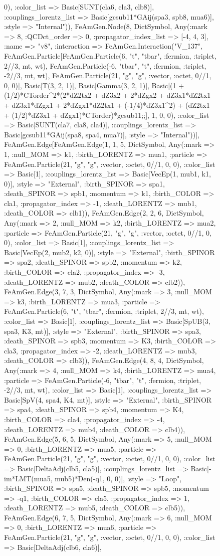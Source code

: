 \documentclass{revtex4}
\begin{document}
\begin{figure}[!htb]
\begin{center}
{0), :color_list => Basic[SUNT(cla6, cla3, clb8)], :couplings_lorentz_list => Basic[gcsub11*GAij(spa3, spb8, mua6)], :style => "Internal")), FeAmGen.Node(8, Dict{Symbol, Any}(:mark => 8, :QCDct_order => 0, :propagator_index_list => [-4, 4, 3], :name => "v8", :interaction => FeAmGen.Interaction("V_137", FeAmGen.Particle[FeAmGen.Particle(6, "t", "tbar", :fermion, :triplet, 2//3, mt, wt), FeAmGen.Particle(-6, "tbar", "t", :fermion, :triplet, -2//3, mt, wt), FeAmGen.Particle(21, "g", "g", :vector, :octet, 0//1, 0, 0)], Basic[T(3, 2, 1)], Basic[Gamma(3, 2, 1)], Basic[(1 + (1/2)*CTorder^2*(2*dZ2tx2 + dZ3x2 + 2*dZgx2 + dZ3x1*dZ2tx1 + dZ3x1*dZgx1 + 2*dZgx1*dZ2tx1 + (-1/4)*dZ3x1^2) + (dZ2tx1 + (1/2)*dZ3x1 + dZgx1)*CTorder)*gcsub11;;], 1, 0, 0), :color_list => Basic[SUNT(cla7, cla8, cla4)], :couplings_lorentz_list => Basic[gcsub11*GAij(spa8, spa4, mua7)], :style => "Internal"))], FeAmGen.Edge[FeAmGen.Edge(1, 1, 5, Dict{Symbol, Any}(:mark => 1, :null_MOM => k1, :birth_LORENTZ => mua1, :particle => FeAmGen.Particle(21, "g", "g", :vector, :octet, 0//1, 0, 0), :color_list => Basic[1], :couplings_lorentz_list => Basic[VecEp(1, mub1, k1, 0)], :style => "External", :birth_SPINOR => spa1, :death_SPINOR => spb1, :momentum => k1, :birth_COLOR => cla1, :propagator_index => -1, :death_LORENTZ => mub1, :death_COLOR => clb1)), FeAmGen.Edge(2, 2, 6, Dict{Symbol, Any}(:mark => 2, :null_MOM => k2, :birth_LORENTZ => mua2, :particle => FeAmGen.Particle(21, "g", "g", :vector, :octet, 0//1, 0, 0), :color_list => Basic[1], :couplings_lorentz_list => Basic[VecEp(2, mub2, k2, 0)], :style => "External", :birth_SPINOR => spa2, :death_SPINOR => spb2, :momentum => k2, :birth_COLOR => cla2, :propagator_index => -3, :death_LORENTZ => mub2, :death_COLOR => clb2)), FeAmGen.Edge(3, 7, 3, Dict{Symbol, Any}(:mark => 3, :null_MOM => k3, :birth_LORENTZ => mua3, :particle => FeAmGen.Particle(6, "t", "tbar", :fermion, :triplet, 2//3, mt, wt), :color_list => Basic[1], :couplings_lorentz_list => Basic[SpUB(3, spa3, K3, mt)], :style => "External", :birth_SPINOR => spa3, :death_SPINOR => spb3, :momentum => K3, :birth_COLOR => cla3, :propagator_index => -2, :death_LORENTZ => mub3, :death_COLOR => clb3)), FeAmGen.Edge(4, 8, 4, Dict{Symbol, Any}(:mark => 4, :null_MOM => k4, :birth_LORENTZ => mua4, :particle => FeAmGen.Particle(-6, "tbar", "t", :fermion, :triplet, -2//3, mt, wt), :color_list => Basic[1], :couplings_lorentz_list => Basic[SpV(4, spa4, K4, mt)], :style => "External", :birth_SPINOR => spa4, :death_SPINOR => spb4, :momentum => K4, :birth_COLOR => cla4, :propagator_index => -4, :death_LORENTZ => mub4, :death_COLOR => clb4)), FeAmGen.Edge(5, 6, 5, Dict{Symbol, Any}(:mark => 5, :null_MOM => 0, :birth_LORENTZ => mua5, :particle => FeAmGen.Particle(21, "g", "g", :vector, :octet, 0//1, 0, 0), :color_list => Basic[DeltaAdj(clb5, cla5)], :couplings_lorentz_list => Basic[-im*LMT(mua5, mub5)*Den(-q1, 0, 0)], :style => "Loop", :birth_SPINOR => spa5, :death_SPINOR => spb5, :momentum => -q1, :birth_COLOR => cla5, :propagator_index => 1, :death_LORENTZ => mub5, :death_COLOR => clb5)), FeAmGen.Edge(6, 7, 5, Dict{Symbol, Any}(:mark => 6, :null_MOM => 0, :birth_LORENTZ => mua6, :particle => FeAmGen.Particle(21, "g", "g", :vector, :octet, 0//1, 0, 0), :color_list => Basic[DeltaAdj(clb6, cla6)], }
\end{center}
\end{figure}
\end{document}
